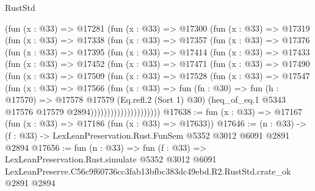 \begin{lexlean}{RustStd}
\begin{coremodule}
          (fun (x : @33) =>
          @17281
            (fun (x : @33) =>
            @17300
              (fun (x : @33) =>
              @17319
                (fun (x : @33) =>
                @17338
                  (fun (x : @33) =>
                  @17357
                    (fun (x : @33) =>
                    @17376
                      (fun (x : @33) =>
                      @17395
                        (fun (x : @33) =>
                        @17414
                          (fun (x : @33) =>
                          @17433
                            (fun (x : @33) =>
                            @17452
                              (fun (x : @33) =>
                              @17471
                                (fun (x : @33) =>
                                @17490
                                  (fun (x : @33) =>
                                  @17509
                                    (fun (x : @33) =>
                                    @17528
                                      (fun (x : @33) =>
                                      @17547
                                        (fun (x : @33) =>
                                        @17566
                                          (fun (x : @33) =>
                                          fun (fn : @30) =>
                                          fun (h : @17570) =>
                                          @17578
                                            @17579
                                            (Eq.refl.{2} (Sort 1) @30)
                                            (heq_of_eq.{1}
                                              @5343
                                              @17576
                                              @17579
                                              @2894)))))))))))))))))))))
@17638 := fun (x : @33) => @17167 (fun (x : @33) => @17186 (fun (x : @33) => @17633))
@17646 := (n : @33) -> (f : @33) -> LexLeanPreservation.Rust.FunSem @5352 @3012 @6091 @2891 @2894
@17656 := fun (n : @33) =>
  fun (f : @33) =>
  LexLeanPreservation.Rust.simulate
    @5352
    @3012
    @6091
    LexLeanPreserve.C56c9f60736cc3fab13bfbc383dc49ebd.R2.RustStd.crate_ok
    @2891
    @2894
\end{coremodule}
\end{lexlean}
